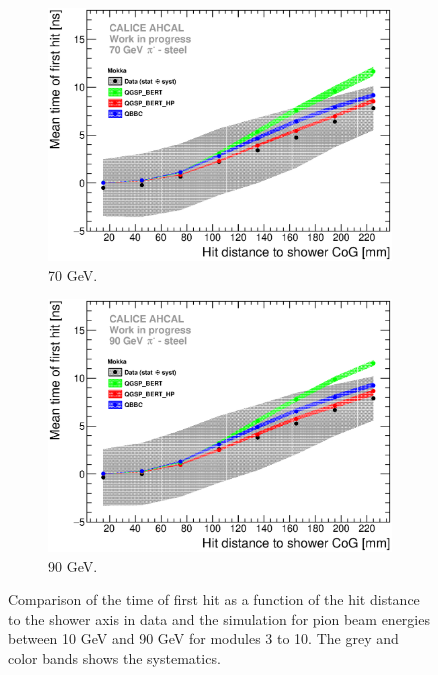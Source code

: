\begin{figure}[htbp!]
\begin{subfigure}[t]{0.49\textwidth}
    \centering
    \includegraphics[width=1\textwidth]{../Thesis_Plots/Timing/Pions/Plots/ComparisonToSim/Time_Radius_70GeV_SSF_Mokka.eps}
    \caption{70 GeV.} \label{fig:Radius_SSF_SimData_70GeV}
  \end{subfigure}
  \hfill
  \begin{subfigure}[t]{0.49\textwidth}
    \centering
    \includegraphics[width=1\textwidth]{../Thesis_Plots/Timing/Pions/Plots/ComparisonToSim/Time_Radius_90GeV_SSF_Mokka.eps}
    \caption{90 GeV.} \label{fig:Radius_SSF_SimData_90GeV}
  \end{subfigure}
  \caption{Comparison of the time of first hit as a function of the hit distance to the shower axis in data and the \mokka simulation for pion beam energies between 10 GeV and 90 GeV for modules 3 to 10. The grey and color bands shows the systematics.}
\end{figure}

